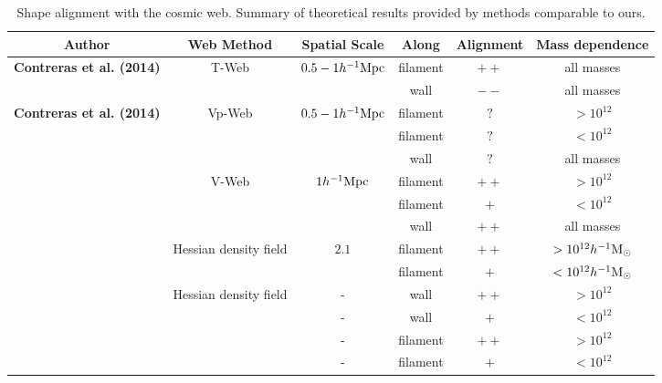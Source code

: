 \documentclass[usenatbib]{mn2e}
\newcommand{\hMpc}{{\ifmmode{h^{-1}{\rm Mpc}}\else{$h^{-1}$Mpc }\fi}}
\newcommand{\hMsun}{{\ifmmode{h^{-1}{\rm
        {M_{\odot}}}}\else{$h^{-1}{\rm{M_{\odot}}}$}\fi}}
\begin{document}
\begin{table}
\begin{tabular}{cccccc}\hline\hline
Author & Web Method & Spatial Scale & Along &
Alignment & Mass dependence\\\hline

{\bf Contreras et al. (2014)} & T-Web & $0.5-1 \hMpc$ & 
filament &$++$ & all masses\hMsun\\
&   & & 
wall & $--$ & all masses\\\hline

{\bf Contreras et al. (2014)} & Vp-Web & $0.5-1 \hMpc$ & 
filament &$?$ & $>10^{12}$\hMsun\\
&   & & 
filament &$?$ & $<10^{12}$\hMsun\\
&   & & 
wall & $?$ & all masses\\\hline

\cite{Libeskind2013} & V-Web & $1 \hMpc$ & 
filament &$++$ & $>10^{12}$\hMsun\\
&   & & 
filament &$+$ & $<10^{12}$\hMsun\\
&   & & 
wall & $++$ & all masses\\\hline

\cite{Zhang2009}  & Hessian density field &  $2.1$\hMpc & 
filament & $++$ & $>10^{12}\hMsun$\\

& &  & 
filament & $+$ & $<10^{12}\hMsun$\\\hline

\cite{AragonCalvo2007} & Hessian density field & - &
wall & $++$ & $>10^{12}$\hMsun\\

& & - &
wall & $+$ & $<10^{12}$\hMsun\\

& & - &
filament& $++$ & $>10^{12}$\hMsun\\

& & - &
filament& $+$ & $<10^{12}$\hMsun\\\hline \hline

\end{tabular}\\
\caption{Shape alignment with the cosmic web. Summary of theoretical
  results provided by methods comparable to ours.}
\end{table}
\end{document}
